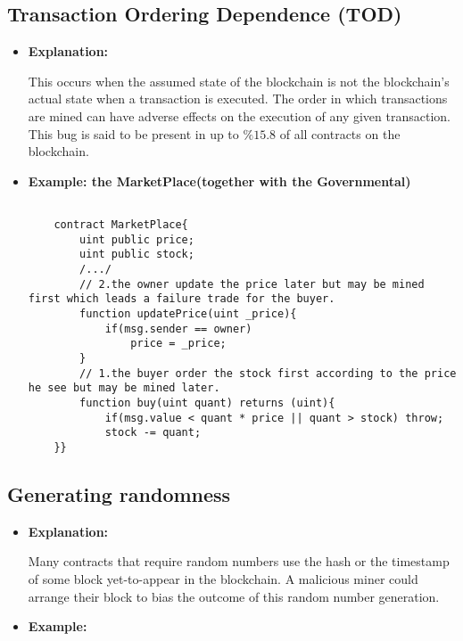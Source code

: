 \documentclass{llncs}
\begin{document}
\subsection{Transaction Ordering Dependence (TOD)}
\begin{itemize}
\item \textbf{Explanation:} 

This occurs when the assumed state of the blockchain is not the blockchain’s actual state when a transaction is executed. The order in which transactions are mined can have adverse effects on the execution of any given transaction. This bug is said to be present in up to $ \%15.8 $ of all contracts on the blockchain.

\item \textbf{Example: the MarketPlace(together with the Governmental)}

	\begin{minipage}{.5\textwidth} 
	{\scriptsize
	\begin{verbatim}
	
	contract MarketPlace{
	    uint public price;
	    uint public stock;
	    /.../
	    // 2.the owner update the price later but may be mined first which leads a failure trade for the buyer.
	    function updatePrice(uint _price){
	        if(msg.sender == owner)
	            price = _price;
	    }
	    // 1.the buyer order the stock first according to the price he see but may be mined later.  
	    function buy(uint quant) returns (uint){
	        if(msg.value < quant * price || quant > stock) throw;
	        stock -= quant;
	}}

	\end{verbatim} }
	\end{minipage}	

\end{itemize}

\subsection{Generating randomness}
\begin{itemize}
\item \textbf{Explanation:} 

Many contracts that require random numbers use the hash or the timestamp of some block yet-to-appear in the blockchain. A malicious miner could arrange their block to bias the outcome of this random number generation.

\item \textbf{Example:}

\end{itemize}
\end{document}
